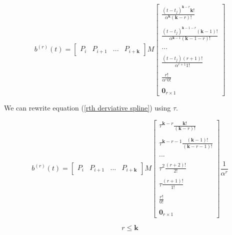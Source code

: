 \documentclass{article}
\begin{document}
\begin{equation} \label{rth derviative spline}
    b^{(r)}(t) = \begin{bmatrix} P_{i} & P_{i+1} & ... & P_{i+\textbf{k}}\end{bmatrix} M \begin{bmatrix}
    \frac{(t-t_j)^{\textbf{k}-r} \textbf{k}!}{ \alpha^{\textbf{k}} (\textbf{k}-r)!} \\ \\ \frac{(t-t_j)^{\textbf{k}-1-r} (\textbf{k}-1)!}{ \alpha^{\textbf{k}-1} (\textbf{k}-1-r)!} \\ \\ 
    ... 
    \\ \\ 
    \frac{(t-t_j)(r+1)!}{\alpha^{r+1} 1! } 
    \\ \\ \frac{r!}{\alpha^r 0!} 
    \\ \\ \textbf{0}_{r \times 1} \end{bmatrix}
\end{equation}

We can rewrite equation (\ref{rth derviative spline}) using \(\tau\).

\begin{equation}
    b^{(r)}(t) = \begin{bmatrix} P_{i} & P_{i+1} & ... & P_{i+\textbf{k}}\end{bmatrix} M \begin{bmatrix} \tau^{\textbf{k}-r} \frac{\textbf{k}!}{(\textbf{k}-r)!} \\\\ 
    \tau^{\textbf{k}-r-1} \frac{(\textbf{k}-1)!}{(\textbf{k}-r-1)!} \\\\
    ... 
    \\\\ 
    \tau^2 \frac{(r+2)!}{2!} \\\\
    \tau \frac{(r+1)!}{1!}
    \\\\  \frac{r!}{0!}
    \\\\ \textbf{0}_{r \times 1} \end{bmatrix} \frac{1}{\alpha^r}
\end{equation}

\begin{equation}
    r \leq \textbf{k}
\end{equation}
    
\end{document}
